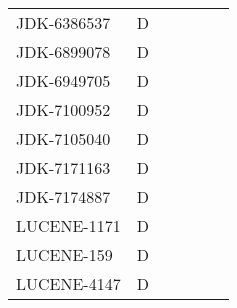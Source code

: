 \begin{table}[!htp]
{\begin{tabular}{lllll}
    JDK-6386537    & D        & ~             & ~               & ~                                           \\
    JDK-6899078    & D        & ~             & ~               & ~                                           \\
    JDK-6949705    & D        & ~             & ~               & ~                                           \\
    JDK-7100952    & D        & ~             & ~               & ~                                           \\
    JDK-7105040    & D        & ~             & ~               & ~                                           \\
    JDK-7171163    & D        & ~             & ~               & ~                                           \\
    JDK-7174887    & D        & ~             & ~               & ~                                           \\
    LUCENE-1171    & D        & ~             & ~               & ~                                           \\
    LUCENE-159     & D        & ~             & ~               & ~                                           \\
    LUCENE-4147    & D        & ~             & ~               & ~                                           \\
	\bottomrule
	\end{tabular}
	}
\end{table}